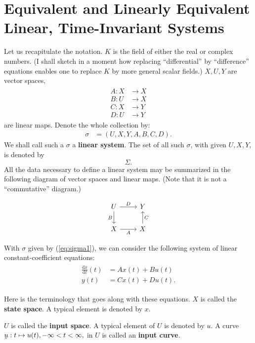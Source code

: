 \documentclass[12pt]{book}
\theoremstyle{plain}
\theoremstyle{definition}
\newcommand{\dd}[1]{\mathrm{d}#1}
\newcommand{\utilde}[1]{\underaccent{\tilde}{#1}}
\begin{document}
\section{Equivalent and Linearly Equivalent Linear, Time-Invariant Systems}

Let us recapitulate the notation.
$K$ is the field of either the real or complex numbers.
(I shall sketch in a moment how replacing ``differential'' by ``difference'' equations enables one to replace $K$ by more general scalar fields.)
$X, U, Y$ are vector spaces,
\begin{align*}
\begin{split}
    A: X &\to X \\
    B: U &\to X \\
    C: X &\to Y \\
    D: U &\to Y
\end{split}
\end{align*}
are linear maps.
Denote the whole collection by:
\begin{align} \label{eq:sigma1}
    \sigma &= (U, X, Y, A, B, C, D).
\end{align}
We shall call such a $\sigma$ a \textbf{linear system}. The set of all such $\sigma$, with given $U, X, Y$, is denoted by
$$\Sigma.$$
All the data necessary to define a linear system may be summarized in the following diagram of vector spaces and linear maps.
(Note that it is not a ``commutative'' diagram.)

\begin{equation*}
\begin{tikzcd}
    U \ar[r,"D"] \ar[d,"B"'] & Y \\
    X \ar[r,"A"'] & X \ar[u,"C"']
\end{tikzcd}
\end{equation*}

With $\sigma$ given by (\ref{eq:sigma1}), we can consider the following system of linear constant-coefficient equations:
\begin{align}
\begin{split} \label{eq:LinearODESystem1}
    \frac{\dd{x}}{\dd{t}}(t) &= Ax(t) + Bu(t) \\
    y(t) &= Cx(t) + Du(t).
\end{split}
\end{align}

Here is the terminology that goes along with these equations.
$X$ is called the \textbf{state space}.
A typical element is denoted by $x$.

$U$ is called the \textbf{input space}.
A typical element of $U$ is denoted by $u$.
A curve $\utilde{u}: t \mapsto u(t), -\infty < t < \infty,$ in $U$ is called an \textbf{input curve}.
\end{document}
